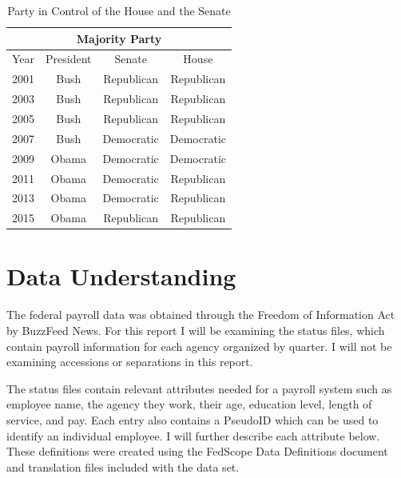 \documentclass{article}
\begin{document}
        \begin{center}
            \begin{table}
                \centering
                \begin{tabular}{ |c|c|c|c| }
                    \hline
                    \multicolumn{4}{|c|}{Majority Party} \\
                    \hline
                    Year & President & Senate & House \\
                    \hline
                    2001 & Bush & Republican & Republican \\
                    2003 & Bush & Republican & Republican \\
                    2005 & Bush & Republican & Republican \\
                    2007 & Bush & Democratic & Democratic \\
                    2009 & Obama & Democratic & Democratic \\
                    2011 & Obama & Democratic & Republican \\
                    2013 & Obama & Democratic & Republican \\
                    2015 & Obama & Republican & Republican \\
                    \hline
                \end{tabular}
                \caption{Party in Control of the House and the Senate}
                \label{tab:1}
            \end{table}
        \end{center}

\section{Data Understanding}
The federal payroll data was obtained through the Freedom of Information Act by BuzzFeed News. For this report I will be examining the status files, which contain payroll information for each agency organized by quarter. I will not be examining accessions or separations in this report.
\par
The status files contain relevant attributes needed for a payroll system such as employee name, the agency they work, their age, education level, length of service, and pay. Each entry also contains a PseudoID which can be used to identify an individual employee. I will further describe each attribute below. These definitions were created using the FedScope Data Definitions document and translation files included with the data set.\cite{datadefs}
\end{document}
